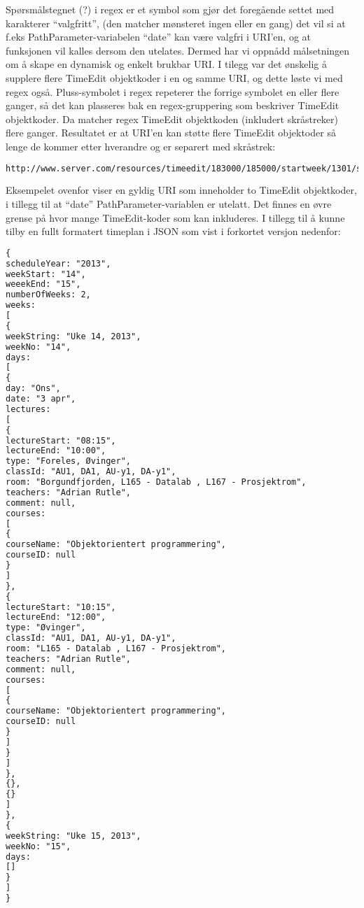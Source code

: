 \documentclass[../main.tex]{subfiles}
\begin{document}
Spørsmålstegnet (?) i regex er et symbol som gjør det foregående settet med karakterer “valgfritt”, (den matcher mønsteret ingen eller en gang) det vil si at f.eks PathParameter-variabelen “date” kan være valgfri i URI’en, og at funksjonen vil kalles dersom den utelates. Dermed har vi oppnådd målsetningen om å skape en dynamisk og enkelt brukbar URI.
\newline
I tilegg var det ønskelig å supplere flere TimeEdit objektkoder i en og samme URI, og dette løste vi med regex også. Pluss-symbolet i regex repeterer the forrige symbolet en eller flere ganger, så det kan plasseres bak en regex-gruppering som beskriver TimeEdit objektkoder. Da matcher regex TimeEdit objektkoden (inkludert skråstreker) flere ganger. Resultatet er at URI’en kan støtte flere TimeEdit objektoder så lenge de kommer etter hverandre og er separert med skråstrek:

\begin{lstlisting}[language=HTML, frame=single, caption={asdasdsadasdasdasdsadsadasdasdsadsa}]
http://www.server.com/resources/timeedit/183000/185000/startweek/1301/stopweek/1315
\end{lstlisting}

Eksempelet ovenfor viser en gyldig URI som inneholder to TimeEdit objektkoder, i tillegg til at “date” PathParameter-variablen er utelatt. Det finnes en øvre grense på hvor mange TimeEdit-koder som kan inkluderes.\newline
\newline
I tillegg til å kunne tilby en fullt formatert timeplan i JSON som vist i forkortet versjon nedenfor:

\begin{lstlisting}[language=HTML, frame=single, caption={asdasdsadasdasdasdsadsadasdasdsadsa}]
{
scheduleYear: "2013",
weekStart: "14",
weeekEnd: "15",
numberOfWeeks: 2,
weeks: 
[
{
weekString: "Uke 14, 2013",
weekNo: "14",
days: 
[
{
day: "Ons",
date: "3 apr",
lectures: 
[
{
lectureStart: "08:15",
lectureEnd: "10:00",
type: "Foreles, Øvinger",
classId: "AU1, DA1, AU-y1, DA-y1",
room: "Borgundfjorden, L165 - Datalab , L167 - Prosjektrom",
teachers: "Adrian Rutle",
comment: null,
courses: 
[
{
courseName: "Objektorientert programmering",
courseID: null
}
]
},
{
lectureStart: "10:15",
lectureEnd: "12:00",
type: "Øvinger",
classId: "AU1, DA1, AU-y1, DA-y1",
room: "L165 - Datalab , L167 - Prosjektrom",
teachers: "Adrian Rutle",
comment: null,
courses: 
[
{
courseName: "Objektorientert programmering",
courseID: null
}
]
}
]
},
{},
{}
]
},
{
weekString: "Uke 15, 2013",
weekNo: "15",
days: 
[]
}
]
}
\end{lstlisting}
\end{document}
